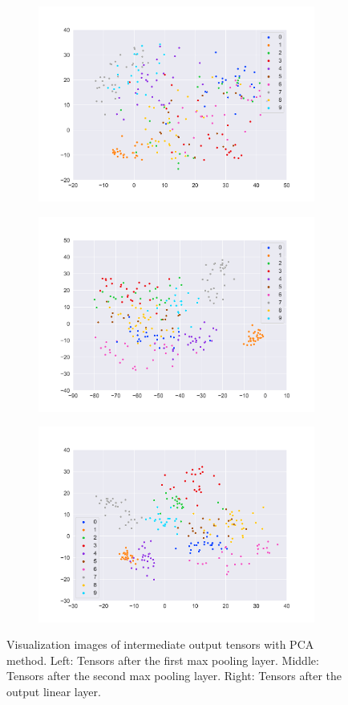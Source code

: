 \begin{figure}[htbp]
    \centering
    \begin{subfigure}
        \centering
        \includegraphics[width=0.32\linewidth]{../images/mnist_feature_map1_pca.png}
        \label{fig:mnist_pca_1}
    \end{subfigure}
    \begin{subfigure}
        \centering
        \includegraphics[width=0.32\linewidth]{../images/mnist_feature_map2_pca.png}
        \label{fig:mnist_pca_2}
    \end{subfigure}
    \begin{subfigure}
        \centering
        \includegraphics[width=0.32\linewidth]{../images/mnist_feature_map3_pca.png}
        \label{fig:mnist_pca_3}
    \end{subfigure}
    \caption{Visualization images of intermediate output tensors with PCA method. Left: Tensors after the first max pooling layer. Middle: Tensors after the second max pooling layer. Right: Tensors after the output linear layer.}
    \label{fig:mnist_pca}
\end{figure}

